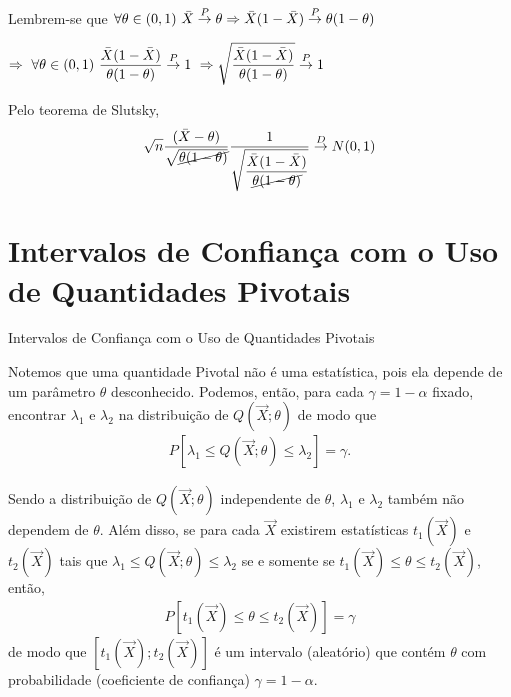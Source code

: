 \documentclass[12pt]{beamer}
\begin{document}
\begin{frame}{}
\begin{block}{}
\justifying
Lembrem-se que $\forall \theta\in (0,1)~\Bar{X}\overset{P}{\rightarrow} \theta \Rightarrow \Bar{X}(1-\Bar{X})\overset{P}{\rightarrow} \theta(1-\theta)$
\end{block}
\pause
\begin{block}{}
\justifying
$\Rightarrow~\forall \theta\in (0,1)~\dfrac{\Bar{X}(1-\Bar{X})}{\theta(1-\theta)}\overset{P}{\rightarrow} 1~\Rightarrow\sqrt{\dfrac{\Bar{X}(1-\Bar{X})}{\theta(1-\theta)}}\overset{P}{\rightarrow} 1$
\end{block}
\pause
\begin{block}{}
\justifying
Pelo teorema de Slutsky,
\begin{align*}
\sqrt{n}\dfrac{(\Bar{X}-\theta)}{\sqrt{\cancel{\theta(1-\theta)}}}\dfrac{1}{\sqrt{\dfrac{\Bar{X}(1-\Bar{X})}{\cancel{\theta(1-\theta)}}}}\overset{D}{\rightarrow} N(0,1)
\end{align*}
\end{block}
\end{frame}

\section{Intervalos de Confiança com o Uso de Quantidades Pivotais}
\begin{frame}{Intervalos de Confiança com o Uso de Quantidades Pivotais}
\begin{block}{}
\justifying
Notemos que uma quantidade Pivotal não é uma estatística, pois ela depende de um parâmetro $\theta$ desconhecido. Podemos, então, para cada $\gamma = 1 - \alpha$ fixado, encontrar $\lambda_1$ e $\lambda_2$ na distribuição de $Q(\Vec{X}; \theta)$ de modo que
\begin{align}\label{eq1}
    P[\lambda_1 \leq Q(\Vec{X}; \theta) \leq \lambda_2] = \gamma.
\end{align}
\end{block}
\end{frame}

\begin{frame}{}
\begin{block}{}
\justifying
Sendo a distribuição de $Q(\Vec{X}; \theta)$ independente de $\theta$, $\lambda_1$ e $\lambda_2$ também não dependem de $\theta$. Além disso, se para cada $\Vec{X}$ existirem estatísticas $t_1(\Vec{X})$ e $t_2(\Vec{X})$ tais que
$\lambda_1 \leq Q(\Vec{X}; \theta) \leq \lambda_2$ se e somente se $t_1(\Vec{X}) \leq \theta \leq t_2(\Vec{X})$,
então,
\begin{align}\label{eq2}
    P[t_1(\Vec{X}) \leq \theta \leq t_2(\Vec{X})] = \gamma
\end{align}
de modo que $[t_1(\Vec{X}); t_2(\Vec{X})]$ é um intervalo (aleatório) que contém $\theta$ com probabilidade (coeficiente de confiança) $\gamma = 1 - \alpha$. 
\end{block}
\end{frame}
\end{document}
